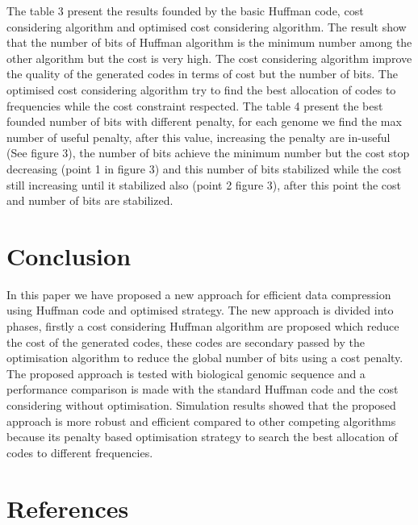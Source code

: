 \documentclass[preprint,12pt]{elsarticle}
\begin{document}
The table 3 present the results founded by the basic Huffman code, cost considering algorithm and optimised cost considering algorithm. The result show that the number of bits of Huffman algorithm is the minimum number among the other algorithm but the cost is  very high. The cost considering algorithm improve the quality of the generated codes in terms of cost but the number of bits. The optimised cost considering algorithm try to find the best allocation of codes to frequencies while the cost constraint respected. The table 4 present the best founded number of bits with different penalty, for each genome we find the max number of useful penalty, after this value, increasing the penalty are in-useful (See figure 3), the number of bits achieve the minimum number but the cost stop decreasing (point 1 in figure 3) and this number of bits stabilized while the cost still increasing until it stabilized also (point 2 figure 3), after this point the cost and number of bits are stabilized.

\section{Conclusion}
\label{sec5}
In this paper we have proposed a new approach for efficient data compression using Huffman code and optimised strategy. The new approach is divided into phases, firstly a cost considering Huffman algorithm are proposed which reduce the cost of the generated codes, these codes are secondary passed by the optimisation algorithm to reduce the global number of bits using a cost penalty.\\
The proposed approach is tested with biological genomic sequence and a performance comparison is made with the standard Huffman code and the cost considering without optimisation. Simulation results showed that the proposed approach is more robust and efficient compared to other competing algorithms because its penalty based optimisation strategy to search the best allocation of codes to different frequencies.






\section*{References}

\end{document}
